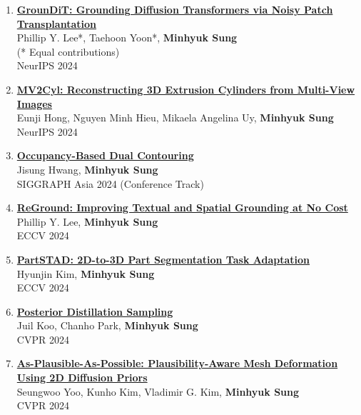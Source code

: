 \documentclass[letterpaper,10pt]{article} %
\newcommand{\blankline}{\quad\pagebreak[2]}
\begin{document}
\begin{enumerate}
\item \label{neurips24_2}
\href{https://arxiv.org/abs/2410.20474}{\textbf{GrounDiT: Grounding Diffusion Transformers via Noisy Patch Transplantation}}\\
Phillip Y. Lee*, Taehoon Yoon*, \textbf{Minhyuk Sung}\\
(* Equal contributions)\\
NeurIPS 2024\\
\blankline

\item \label{neurips24_1}
\href{https://arxiv.org/abs/2406.10853}{\textbf{MV2Cyl: Reconstructing 3D Extrusion Cylinders from Multi-View Images}}\\
Eunji Hong, Nguyen Minh Hieu, Mikaela Angelina Uy, \textbf{Minhyuk Sung}\\
NeurIPS 2024\\
\blankline

\item \label{siggraphasia24}
\href{https://arxiv.org/abs/2409.13418}{\textbf{Occupancy-Based Dual Contouring}}\\
Jisung Hwang, \textbf{Minhyuk Sung}\\
SIGGRAPH Asia 2024 (Conference Track)\\
\blankline

\item \label{eccv24_2}
\href{https://arxiv.org/abs/2403.13589}{\textbf{ReGround: Improving Textual and Spatial Grounding at No Cost}}\\
Phillip Y. Lee, \textbf{Minhyuk Sung}\\
ECCV 2024\\
\blankline

\item \label{eccv24_1}
\href{https://arxiv.org/abs/2401.05906}{\textbf{PartSTAD: 2D-to-3D Part Segmentation Task Adaptation}}\\
Hyunjin Kim, \textbf{Minhyuk Sung}\\
ECCV 2024\\
\blankline

\item \label{cvpr24_3}
\href{https://arxiv.org/abs/2311.13831}{\textbf{Posterior Distillation Sampling}}\\
Juil Koo, Chanho Park, \textbf{Minhyuk Sung}\\
CVPR 2024\\
\blankline

\item \label{cvpr24_2}
\href{https://arxiv.org/abs/2311.16739}{\textbf{As-Plausible-As-Possible: Plausibility-Aware Mesh Deformation Using 2D Diffusion Priors}}\\
Seungwoo Yoo, Kunho Kim, Vladimir G. Kim, \textbf{Minhyuk Sung}\\
CVPR 2024\\
\blankline


\end{enumerate}
\end{document}
